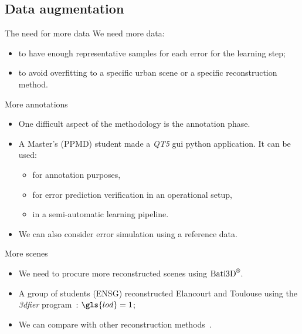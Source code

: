 \documentclass{beamer}
\begin{document}
        \subsection{Data augmentation}
            \begin{frame}{The need for more data}
                We need more data:
                \begin{itemize}[label=$\blacktriangleright$, font=\color{IGNGreen}]
                    \item to have enough representative samples for each error for the learning step;
                    \item to avoid overfitting to a specific urban scene or a specific reconstruction method.
                \end{itemize}
            \end{frame}
            \begin{frame}{More annotations}
                \begin{itemize}[label=$\blacktriangleright$, font=\color{IGNGreen}]
                    \item<1-> One difficult aspect of the methodology is the annotation phase.
                    \item<2-> A Master's (PPMD) student made a \emph{QT5} \acrshort{gui} python application. It can be used:
                    \begin{itemize}[label=--]
                        \item<3-> for annotation purposes,
                        \item<4-> for error prediction verification in an operational setup,
                        \item<5-> in a semi-automatic learning pipeline.
                    \end{itemize}
                    \item<6-> We can also consider error simulation using a reference data.
                \end{itemize}
            \end{frame}
            \begin{frame}{More scenes}
                \begin{itemize}[label=$\blacktriangleright$, font=\color{IGNGreen}]
                    \item<1-> We need to procure more reconstructed scenes using $\text{Bati3D}^\text{\textregistered}$.
                    \item<2-> A group of students (ENSG) reconstructed Elancourt and Toulouse using the \emph{3dfier} program~\citep{ledoux2011topologically}: $\gls{lod} = 1$;
                    \item<3-> We can compare with other reconstruction methods~\citep{Lafarge2012,kelly2017bigsur}.
                \end{itemize}
            \end{frame}
\end{document}
